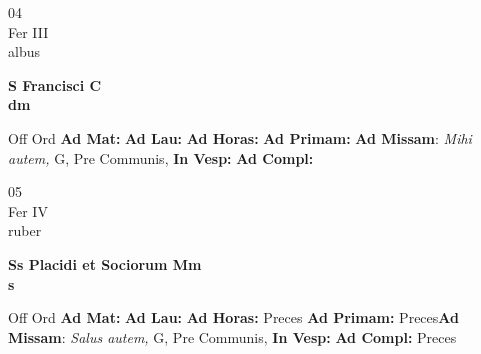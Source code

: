 \documentclass[10pt, openany]{book}
\begin{document}
    \begin{center}
        \begin{minipage}{3.5in}
            \vspace{2em}
            \begin{minipage}{0.5in}
                {\Huge 04} \\
                {\normalsize Fer III} \\
                {\normalsize albus}
            \end{minipage}
            \begin{minipage}{3.0in}
                \textbf{ \large S Francisci C \\
                \textnormal{\normalsize dm}} \\ 
            \end{minipage}
            \begin{justify}Off Ord
                \textbf{Ad Mat: }
                \textbf{Ad Lau: }
                \textbf{Ad Horas: }
                \textbf{Ad Primam: }\textbf{Ad Missam}: \textit{Mihi autem,} G, Pre Communis,  
                \textbf{In Vesp: }
                \textbf{Ad Compl: }
            \end{justify}
        \end{minipage}
    \end{center}

    \begin{center}
        \begin{minipage}{3.5in}
            \vspace{2em}
            \begin{minipage}{0.5in}
                {\Huge 05} \\
                {\normalsize Fer IV} \\
                {\normalsize ruber}
            \end{minipage}
            \begin{minipage}{3.0in}
                \textbf{ \large Ss Placidi et Sociorum Mm \\
                \textnormal{\normalsize s}} \\ 
            \end{minipage}
            \begin{justify}Off Ord
                \textbf{Ad Mat: }
                \textbf{Ad Lau: }
                \textbf{Ad Horas: }Preces
                \textbf{Ad Primam: }Preces\textbf{Ad Missam}: \textit{Salus autem,} G, Pre Communis,  
                \textbf{In Vesp: }
                \textbf{Ad Compl: }Preces
            \end{justify}
        \end{minipage}
    \end{center}
\end{document}
